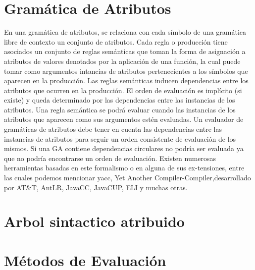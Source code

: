 \section{Gramática de Atributos}

En una gramática de atributos, se relaciona con cada símbolo de una gramática libre de contexto un conjunto de atributos. Cada regla o producción tiene asociados un conjunto de reglas semánticas que toman la forma de asignación a atributos de valores denotados por la aplicación de una función, la cual puede tomar como argumentos intancias de atributos pertenecientes a los símbolos que aparecen en la producción.
Las reglas semánticas inducen dependencias entre los atributos que ocurren en la producción. El orden de evaluación es implícito (si existe) y queda determinado por las dependencias entre las instancias de los atributos.
Una regla semántica se podrá evaluar cuando las instancias de los atributos que aparecen como sus argumentos estén evaluadas. Un evaluador de gramáticas de atributos debe tener en cuenta las dependencias entre las instancias de atributos para seguir un orden consistente de evaluación de los mismos.
Si una GA contiene dependencias circulares no podría ser evaluada ya que no podría encontrarse un orden de evaluación. Existen numerosas herramientas basadas en este formalismo o en alguna de sus ex-tensiones, entre las cuales podemos mencionar yacc, Yet Another Compiler-Compiler,desarrollado por AT\&T, AntLR, JavaCC, JavaCUP, ELI y muchas otras.


\section{Arbol sintactico atribuido}


\section{Métodos de Evaluación}


